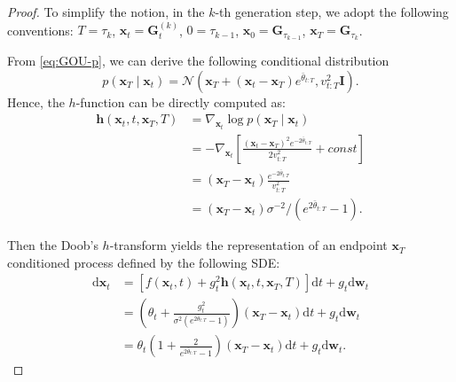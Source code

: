 \begin{proof}
To simplify the notion, in the $k$-th generation step, we adopt the following conventions: 
 $T=\tau_k$, $\mathbf{x}_t = \bm{G}_t^{(k)}$, $0=\tau_{k-1}$, $\mathbf{x}_0=\bm{G}_{\tau_{k-1}}$, $\mathbf{x}_T=\bm{G}_{\tau_k}$. 

From \cref{eq:GOU-p}, we can derive the following conditional distribution
\begin{equation}
    p(\mathbf{x}_T \mid \mathbf{x}_t)=\mathcal{N}(
    \mathbf{x}_T + (\mathbf{x}_t-\mathbf{x}_T) e^{\bar{\theta}_{t:T}},
    v_{t:T}^2 \bm{I}).
\end{equation}
Hence, the $h$-function can be directly computed as:
\begin{equation}
\begin{split}
\bm{h}(\mathbf{x}_t, t, \mathbf{x}_T, T) 
& = \nabla_{\mathbf{x}_t} \log p(\mathbf{x}_T \mid \mathbf{x}_t)\\
& = -\nabla_{\mathbf{x}_t} \left[\frac{(\mathbf{x}_t - \mathbf{x}_T)^2 e^{-2 \bar{\theta}_{t:T}}}{2 v_{t:T}^2} + const \right]\\
& = (\mathbf{x}_T - \mathbf{x}_t) \frac{e^{-2 \bar{\theta}_{t:T}}}{v_{t:T}^2} \\
& = (\mathbf{x}_T - \mathbf{x}_t) \sigma^{-2}/(e^{2\bar{\theta}_{t:T}}-1).
\end{split}
\end{equation}


Then the Doob's $h$-transform yields the representation of an endpoint $\mathbf{x}_T$ conditioned process defined by the following SDE: 
% 
\begin{equation}
\begin{split}
\mathrm{d}\mathbf{x}_t 
&= \left[ f(\mathbf{x}_t, t) + g_t^2 \bm{h}(\mathbf{x}_t, t, \mathbf{x}_T, T) \right] \mathrm{d}t + g_t \mathrm{d}\mathbf{w}_t\\
&= \left( \theta_t + \frac{g_t^2}{\sigma^2 (e^{2\bar{\theta}_{t:T}}-1)}  \right)(\mathbf{x}_T - \mathbf{x}_t)  \mathrm{d}t + g_t \mathrm{d}\mathbf{w}_t \\
& = \theta_t \left( 1 + \frac{2}{e^{2\bar{\theta}_{t:T}}-1}  \right)(\mathbf{x}_T - \mathbf{x}_t)  \mathrm{d}t + g_t \mathrm{d}\mathbf{w}_t.
\end{split}
\end{equation}


\end{proof}
